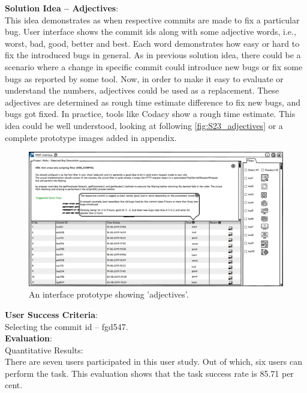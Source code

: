 \textbf{Solution Idea – Adjectives}: \\

This idea demonstrates as when respective commits are made to fix a particular bug. User interface shows the commit ids along with some adjective words, i.e., worst, bad, good, better and best. Each word demonstrates how easy or hard to fix the introduced bugs in general. As in previous solution idea, there could be a scenario where a change in specific commit could introduce new bugs or fix some bugs as reported by some tool. Now, in order to make it easy to evaluate or understand the numbers, adjectives could be used as a replacement. These adjectives are determined as rough time estimate difference to fix new bugs, and bugs got fixed. In practice, tools like Codacy show a rough time estimate. This idea could be well understood, looking at following \autoref{fig:S23_adjectives} or a complete prototype images added in appendix. \\


\begin{figure}[hbt!]
	\centering
	\includegraphics[width=\linewidth]{figures/solution_ideas_snaps/S23_adjectives}
	\caption{An interface prototype showing 'adjectives'.}
	\label{fig:S23_adjectives}
\end{figure}

\textbf{User Success Criteria}: \\

Selecting the commit id – fgd547. \\

\textbf{Evaluation}: \\

Quantitative Results: \\

There are seven users participated in this user study. Out of which, six users can perform the task. This evaluation shows that the task success rate is 85.71 per cent. \\

